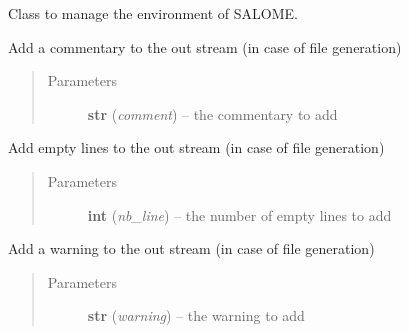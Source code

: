 \documentclass[a4paper,10pt,english]{sphinxmanual}
\begin{document}
\begin{fulllineitems}
\label{commands/apidoc/src:src.environment.SalomeEnviron}
Class to manage the environment of SALOME.

\begin{fulllineitems}
\label{commands/apidoc/src:src.environment.SalomeEnviron.add_comment}
Add a commentary to the out stream (in case of file generation)
\begin{quote}\begin{description}
\item[{Parameters}] \leavevmode
\textbf{str} (\emph{comment}) -- the commentary to add

\end{description}\end{quote}

\end{fulllineitems}


\begin{fulllineitems}
\label{commands/apidoc/src:src.environment.SalomeEnviron.add_line}
Add empty lines to the out stream (in case of file generation)
\begin{quote}\begin{description}
\item[{Parameters}] \leavevmode
\textbf{int} (\emph{nb\_line}) -- the number of empty lines to add

\end{description}\end{quote}

\end{fulllineitems}


\begin{fulllineitems}
\label{commands/apidoc/src:src.environment.SalomeEnviron.add_warning}
Add a warning to the out stream (in case of file generation)
\begin{quote}\begin{description}
\item[{Parameters}] \leavevmode
\textbf{str} (\emph{warning}) -- the warning to add


\end{description}
\end{quote}
\end{fulllineitems}
\end{fulllineitems}
\end{document}

